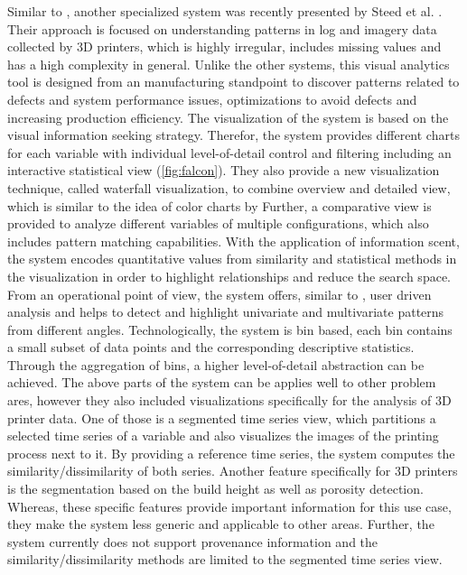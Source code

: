 \documentclass[electronic]{vgtc}             %
\begin{document}
Similar to \cite{Xie:2014}, another specialized system was recently presented by Steed et al. \cite{steed:2017}.
Their approach is focused on understanding patterns in log and imagery data collected by 3D printers, which is highly irregular, includes missing values and has a high complexity in general.
Unlike the other systems, this visual analytics tool is designed from an manufacturing standpoint to discover patterns related to defects and system performance issues, optimizations to avoid defects and increasing production efficiency.
The visualization of the system is based on the visual information seeking strategy.
Therefor, the system provides different charts for each variable with individual level-of-detail control and filtering including an interactive statistical view (\autoref{fig:falcon}). 
They also provide a new visualization technique, called waterfall visualization, to combine overview and detailed view, which is similar to the idea of color charts by \cite{ichikawa:2002}
Further, a comparative view is provided to analyze different variables of multiple configurations, which also includes pattern matching capabilities. 
With the application of information scent, the system encodes quantitative values from similarity and statistical methods in the visualization in order to highlight relationships and reduce the search space. 
From an operational point of view, the system offers, similar to \cite{Xie:2014}, user driven analysis and helps to detect and highlight univariate and multivariate patterns from different angles.
Technologically, the system is bin based, each bin contains a small subset of data points and the corresponding descriptive statistics. 
Through the aggregation of bins, a higher level-of-detail abstraction can be achieved. 
The above parts of the system can be applies well to other problem ares, however they also included visualizations specifically for the analysis of 3D printer data.
One of those is a segmented time series view, which partitions a selected time series of a variable and also visualizes the images of the printing process next to it. 
By providing a reference time series, the system computes the similarity/dissimilarity of both series.
Another feature specifically for 3D printers is the segmentation based on the build height as well as porosity detection.
Whereas, these specific features provide important information for this use case, they make the system less generic and applicable to other areas. 
Further, the system currently does not support provenance information and the similarity/dissimilarity methods are limited to the segmented time series view.
\end{document}
